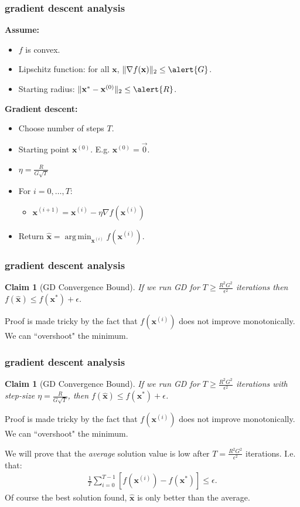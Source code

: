 \documentclass[compress]{beamer}
\newcommand{\bv}[1]{\mathbf{#1}}
\DeclareMathOperator*{\argmin}{arg\,min}
\newtheorem{claim}[theorem]{Claim}
\begin{document}
\begin{frame}[t]
	\frametitle{gradient descent analysis}
	\textbf{Assume:}
	\begin{itemize}
		\item $f$ is convex.
		\item Lipschitz function: for all $\bv{x}$, $\|\nabla f(\bv{x})\|_2 \leq \alert{G}$.
		\item Starting radius: $\|\bv{x}^{*} - \bv{x}^{(0)}\|_2 \leq \alert{R}$.
	\end{itemize}
	
	\textbf{Gradient descent:}
	\begin{itemize}
		\item Choose number of steps $T$.
		\item Starting point $\bv{x}^{(0)}$. E.g.  $\bv{x}^{(0)} = \vec{0}$.
		\item $\eta = \frac{R}{G\sqrt{T}}$
		\item For $i = 0,\ldots, T$:
		\begin{itemize}
			\item $\bv{x}^{(i+1)} = \bv{x}^{(i)} - \eta \nabla f(\bv{x}^{(i)})$
		\end{itemize}
		\item Return $\hat{\bv{x}} = \argmin_{\bv{x}^{(i)}} f(\bv{x}^{(i)})$.
	\end{itemize}
\end{frame}

\begin{frame}[t]
	\frametitle{gradient descent analysis}
	\begin{claim}[GD Convergence Bound]
		If we run GD for $T \geq \frac{R^2G^2}{\epsilon^2}$ iterations then $f(\hat{\bv{x}}) \leq f(\bv{x}^*) + \epsilon$.
	\end{claim}


	\vspace{12em}
	Proof is made tricky by the fact that $f(\bv{x}^{(i)})$ does not improve monotonically. We can ``overshoot" the minimum. 
\end{frame}

\begin{frame}[t]
	\frametitle{gradient descent analysis}
	\begin{claim}[GD Convergence Bound]
		If we run GD for $T \geq \frac{R^2G^2}{\epsilon^2}$ iterations with step-size $\eta = \frac{R}{G\sqrt{T}}$, then $f(\hat{\bv{x}}) \leq f(\bv{x}^*) + \epsilon$.
	\end{claim}

	Proof is made tricky by the fact that $f(\bv{x}^{(i)})$ does not improve monotonically. We can ``overshoot" the minimum. 
	
	We will prove that the \emph{average} solution value is low after $T = \frac{R^2G^2}{\epsilon^2}$ iterations. I.e. that:
	\begin{align*}
		\frac{1}{T}\sum_{i=0}^{T-1}\left[f(\bv{x}^{(i)}) - f(\bv{x}^*)\right]  \leq \epsilon.
	\end{align*}
Of course the best solution found, $\hat{\bv{x}}$ is only better than the average.
\end{frame}
\end{document}
